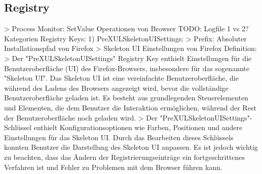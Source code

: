 \subsection*{Registry}
> Process Monitor: SetValue Operationen von Browser 
TODO: Logfile 1 vs 2?
	Kategorien Registry Keys:
	1) PreXULSkeletonUISettings:
		> Prefix: Absoluter Installationspfad von Firefox
		> Skeleton UI Einstellungen von Firefox %
			Definition:
				> Der "PreXULSkeletonUISettings" Registry Key enthielt Einstellungen für die Benutzeroberfläche (UI) des Firefox-Browsers, insbesondere für das sogenannte "Skeleton UI". Das Skeleton UI ist eine vereinfachte Benutzeroberfläche, die während des Ladens des Browsers angezeigt wird, bevor die vollständige Benutzeroberfläche geladen ist. Es besteht aus grundlegenden Steuerelementen und Elementen, die dem Benutzer die Interaktion ermöglichen, während der Rest der Benutzeroberfläche noch geladen wird.
				> Der "PreXULSkeletonUISettings"-Schlüssel enthielt Konfigurationsoptionen wie Farben, Positionen und andere Einstellungen für das Skeleton UI. Durch das Bearbeiten dieses Schlüssels konnten Benutzer die Darstellung des Skeleton UI anpassen. Es ist jedoch wichtig zu beachten, dass das Ändern der Registrierungseinträge ein fortgeschrittenes Verfahren ist und Fehler zu Problemen mit dem Browser führen kann.
			
